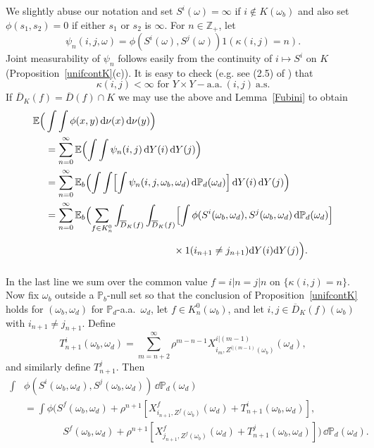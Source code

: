 \documentclass[12pt]{article}
\makeatletter
\renewenvironment{proof}[1][\proofname]{%
\par\pushQED{\qed}\normalfont%
\topsep6\p@\@plus6\p@\relax
\trivlist\item[\hskip\labelsep\bfseries#1\@addpunct{.}]%
\ignorespaces
}{%
\popQED\endtrivlist\@endpefalse
}
\numberwithin{theorem}{section}
\theoremstyle{def}
\numberwithin{equation}{section}
\renewcommand{\P}{\mathbb{P}}
\newcommand{\E}{\mathbb{E}}
\newcommand{\Z}{\mathbb{Z}}
\makeatother
\begin{document}
\begin{proof} We slightly abuse our notation and set $S^i(\omega)=\infty$ if $i\notin K(\omega_b)$ and also set $\phi(s_1,s_2)=0$ if either $s_1$ or $s_2$ is $\infty$. For $n\in\Z_+$, let 
\[\psi_n(i,j,\omega)=\phi(S^i(\omega),S^j(\omega))1(\kappa(i,j)=n).\]  
Joint measurability of $\psi_n$ follows easily from the continuity of $i\mapsto S^i$ on $K$ (Proposition~\ref{unifcontK}(c)).
It is easy to check (e.g. see (2.5) of \cite{ADHP}) that 
\[\kappa(i,j)<\infty \text{ for }Y\times Y-\text{a.a.}\  (i,j)\ \text{a.s.}\]
If $\overline D_K(f)=\overline D(f)\cap K$ we may use the above and Lemma~\ref{Fubini} to obtain
\begin{align}\label{doubleint}
\nonumber\E\Bigl(&\int\int \phi(x,y)\,\dd \nu(x)\,\dd \nu(y)\Bigr)\\
\nonumber&=\sum_{n=0}^\infty\E\Bigl(\int\int \psi_n(i,j)\,\dd Y(i)\,\dd Y(j)\Bigr)\\
\nonumber&=\sum_{n=0}^\infty\E_b\Bigl(\int\int\Bigl[\int \psi_n(i,j,\omega_b,\omega_d)\,\dd \P_d(\omega_d)\Bigr]\,\dd Y(i)\,\dd Y(j)\Bigr)\\
\nonumber&=\sum_{n=0}^\infty\E_b\Bigl(\sum_{f\in K^0_n}\int_{\overline D_K(f)}\int_{\overline D_K(f)} \Bigl[\int\phi(S^i(\omega_b,\omega_d),S^j(\omega_b,\omega_d)\,\dd \P_d(\omega_d)\Bigr]\\
&\phantom{=\sum_{n=0}^\infty\E_b\Bigl(\sum_{f\in K^0_n}\int_{\overline D_K(f)}\int_{\overline D_K(f)}}\times 1(i_{n+1}\neq j_{n+1})\dd Y(i)\dd Y(j)\Bigr).
\end{align}
In the last line we sum over the common value $f=i|n=j|n$ on $\{\kappa(i,j)=n\}$. Now fix $\omega_b$ outside a $\P_b$-null set so that the conclusion of Proposition~\ref{unifcontK} holds for $(\omega_b,\omega_d)$ for $\P_d$-a.a.~$\omega_d$, let $f\in K^0_n(\omega_b)$, and let $i,j\in\overline D_K(f)(\omega_b)$ with $i_{n+1}\neq j_{n+1}$.  Define
\[T^i_{n+1}(\omega_b,\omega_d)=\sum_{m=n+2}^\infty\rho^{m-n-1}X^{i|(m-1)}_{i_m,Z^{i|(m-1)}(\omega_b)}(\omega_d),\]
and similarly define $T^j_{n+1}$. Then
\begin{align}\label{innerint}
\nonumber\int&\phi(S^i(\omega_b,\omega_d),S^j(\omega_b,\omega_d))\,\dd \P_d(\omega_d)\\
&=\int \phi(S^f(\omega_b,\omega_d)+\rho^{n+1}[X^f_{i_{n+1},Z^f(\omega_b)}(\omega_d)+T^i_{n+1}(\omega_b,\omega_d)],\\
\nonumber&\phantom{=\int \phi(S }S^f(\omega_b,\omega_d)+\rho^{n+1}[X^f_{j_{n+1},Z^f(\omega_b)}(\omega_d)+T^j_{n+1}(\omega_b,\omega_d)])\,\dd \P_d(\omega_d).
\end{align}

\end{proof}
\end{document}
